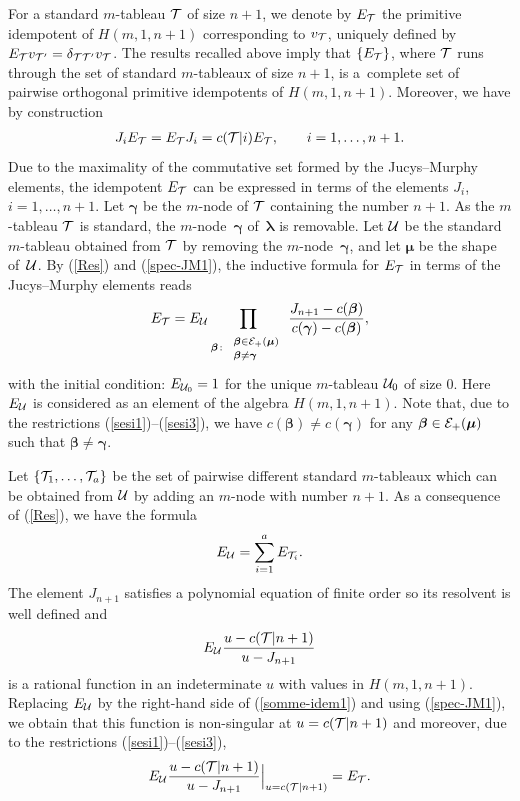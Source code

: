 \documentclass[pdftex]{sigma}
\newcommand{\lam}{\boldsymbol{\lambda}}
\newcommand{\mum}{\boldsymbol{\mu}}
\newcommand{\bem}{\boldsymbol{\beta}}
\newcommand{\gam}{\boldsymbol{\gamma}}
\begin{document}
For a standard $m$-tableau ${\cal{T}}$ of size $n+1$, we denote by $E_{{\cal{T}}}$ the primitive idempotent of $H(m,1,n+1)$ corresponding to $v_{{\cal{T}}}$, uniquely def\/ined by
$E_{{\cal{T}}}v_{{\cal{T'}}}=\delta_{{\cal{T}}{\cal{T'}}}v_{{\cal{T}}}$.
The results recalled above imply that $\{E_{{\cal{T}}}\}$, where ${\cal{T}}$ runs through the set of standard $m$-tableaux of size $n+1$, is a~complete set of pairwise orthogonal primitive idempotents of $H(m,1,n+1)$. Moreover, we have
by construction
\begin{gather}\label{spec-JM1}
J_i E_{{\cal{T}}}=E_{{\cal{T}}}J_i=c({\cal{T}}|i) E_{{\cal{T}}} ,\qquad i=1,\dots,n+1  .
\end{gather}
Due to the maximality of the commutative set formed by the Jucys--Murphy elements, the idempotent $E_{{\cal{T}}}$ can be expressed in terms of the elements $J_i$, $i=1,\dots,n+1$.
Let $\gam$ be the $m$-node of ${\cal{T}}$ containing the number $n+1$. As the $m$-tableau ${\cal{T}}$ is standard, the $m$-node~$\gam$ of~$\lam$ is removable. Let ${\cal{U}}$ be the standard $m$-tableau obtained from ${\cal{T}}$ by removing the $m$-node~$\gam$, and let $\mum$ be the shape of~${\cal{U}}$.
By (\ref{Res}) and (\ref{spec-JM1}), the inductive formula for $E_{{\cal{T}}}$ in terms of the Jucys--Murphy elements reads
\begin{gather*}%
E_{{\cal{T}}}=E_{{\cal{U}}}\prod_{\bem\colon \begin{array}{l}\scriptstyle{\bem\in
{\cal{E}}_+(\mum)}\\[-0.5ex] \scriptstyle{\bem\neq \gam}\end{array}} \frac{J_{n+1}-c(\bem)}{c(\gam)-c(\bem)}  ,
\end{gather*}
with the initial condition: $E_{{\cal{U}}_0}=1$ for the unique $m$-tableau ${\cal{U}}_0$ of size $0$. Here $E_{{\cal{U}}}$ is considered
as an element of the algebra $H(m,1,n+1)$. Note that, due to the restrictions (\ref{sesi1})--(\ref{sesi3}), we have $c(\bem)\neq c(\gam)$ for any $\bem\in {\cal{E}}_+(\mum)$ such that $\bem\neq \gam$.


Let $\{ {\cal{T}}_1,\dots,{\cal{T}}_a\}$ be the set of pairwise dif\/ferent standard $m$-tableaux which can be obtained from ${\cal{U}}$ by adding an $m$-node with number $n+1$.
As a consequence of (\ref{Res}), we have the formula
\begin{gather}\label{somme-idem1}
E_{{\cal{U}}}=\sum_{i=1}^a E_{{\cal{T}}_i} .
\end{gather}
The element $J_{n+1}$ satisf\/ies a polynomial equation of f\/inite order so its resolvent is well def\/ined and
\[ E_{{\cal{U}}}  \frac{u-c({\cal{T}}|n+1)}{u-J_{n+1}}\]
is a rational function in an indeterminate $u$ with values in $H(m,1,n+1)$. Replacing $E_{{\cal{U}}}$ by the right-hand side of (\ref{somme-idem1}) and using (\ref{spec-JM1}), we obtain that this function
is non-singular at $u=c({\cal{T}}|n+1)$ and moreover, due to the restrictions (\ref{sesi1})--(\ref{sesi3}),
\begin{gather}\label{idem-JM-inter1} E_{{\cal{U}}}
\frac{u-c({\cal{T}}|n+1)}{u-J_{n+1}} \Bigr\rvert_{u=c({\cal{T}}|n+1)}=E_{{\cal{T}}} .
\end{gather}
\end{document}
